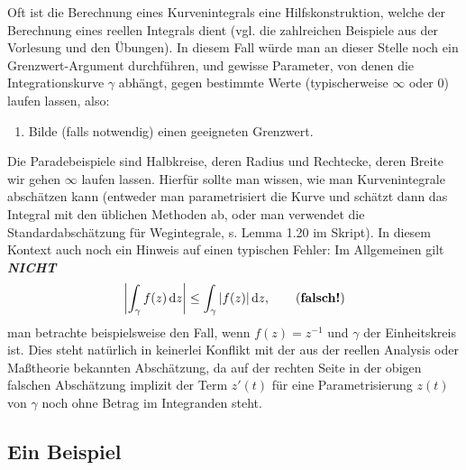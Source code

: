 \documentclass{article}
\theoremstyle{plain}
\theoremstyle{definition}
\begin{document}
Oft ist die Berechnung eines Kurvenintegrals eine Hilfskonstruktion, welche der Berechnung eines reellen Integrals dient (vgl. die zahlreichen Beispiele aus der Vorlesung und den Übungen).
In diesem Fall würde man an dieser Stelle noch ein Grenzwert-Argument durchführen, und gewisse Parameter, von denen die Integrationskurve $\gamma$ abhängt, gegen bestimmte Werte (typischerweise $\infty$ oder $0$) laufen lassen, also:
\begin{tcolorbox}
	\begin{enumerate}
		\item[6.] Bilde (falls notwendig) einen geeigneten Grenzwert.
	\end{enumerate}
\end{tcolorbox}
Die Paradebeispiele sind Halbkreise, deren Radius und Rechtecke, deren Breite wir gehen $\infty$ laufen lassen.
Hierfür sollte man wissen, wie man Kurvenintegrale abschätzen kann (entweder man parametrisiert die Kurve und schätzt dann das Integral mit den üblichen Methoden ab, oder man verwendet die Standardabschätzung für Wegintegrale, s. Lemma 1.20 im Skript).
In diesem Kontext auch noch ein Hinweis auf einen typischen Fehler: Im Allgemeinen gilt \emph{\textbf{NICHT}}
\[
	\left|\int_{\gamma} f(z) \,\mathrm{d}z \right| \le \int_{\gamma} |f(z)| \,\mathrm{d}z, \tag{\textbf{falsch!}}
\]
man betrachte beispielsweise den Fall, wenn $f(z) = z^{-1}$ und $\gamma$ der Einheitskreis ist.
Dies steht natürlich in keinerlei Konflikt mit der aus der reellen Analysis oder Maßtheorie bekannten Abschätzung, da auf der rechten Seite in der obigen falschen Abschätzung implizit der Term $z'(t)$ für eine Parametrisierung $z(t)$ von $\gamma$ noch ohne Betrag im Integranden steht.

\subsection{Ein Beispiel}
\end{document}
